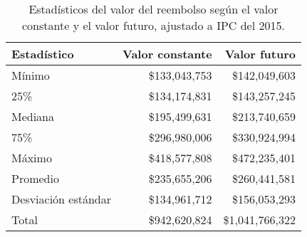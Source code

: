 \begin{table}[!htbp]
\centering
\caption{Estadísticos del valor del reembolso según el valor constante
y el valor futuro, ajustado a IPC del 2015.} 
\label{tab:reembolso}
\begin{tabular}{lrr}
  \hline
Estadístico & Valor constante & Valor futuro \\ 
  \hline
Mínimo & \$133,043,753 & \$142,049,603 \\ 
  25\% & \$134,174,831 & \$143,257,245 \\ 
  Mediana & \$195,499,631 & \$213,740,659 \\ 
  75\% & \$296,980,006 & \$330,924,994 \\ 
  Máximo & \$418,577,808 & \$472,235,401 \\ 
  Promedio & \$235,655,206 & \$260,441,581 \\ 
  Desviación estándar & \$134,961,712 & \$156,053,293 \\ 
  Total & \$942,620,824 & \$1,041,766,322 \\ 
   \hline
\end{tabular}
\end{table}
